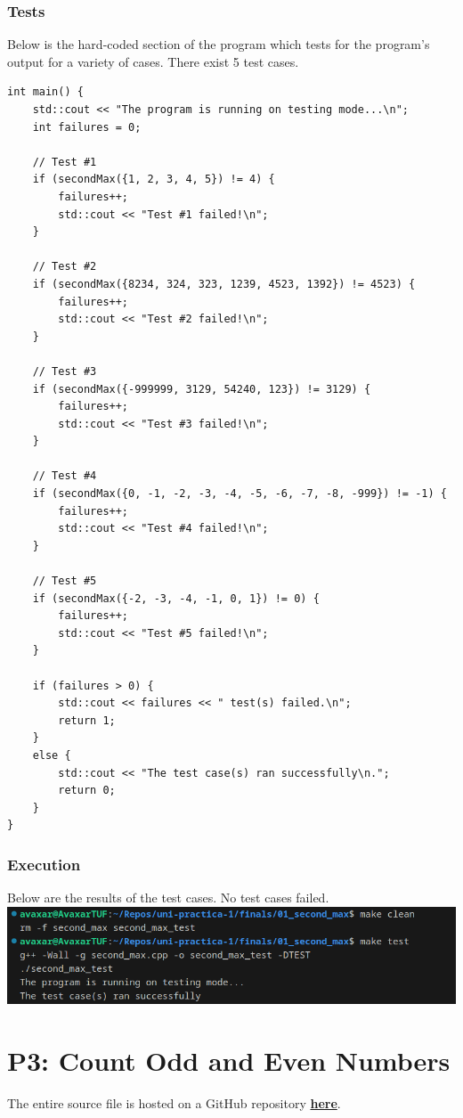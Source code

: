 \documentclass[12pt]{article}
\begin{document}
\subsubsection{Tests}

Below is the hard-coded section of the program which tests for the program's output for a variety of cases. There exist 5 test cases.

\begin{verbatim}
int main() {
    std::cout << "The program is running on testing mode...\n";
    int failures = 0;

    // Test #1
    if (secondMax({1, 2, 3, 4, 5}) != 4) {
        failures++;
        std::cout << "Test #1 failed!\n";
    }

    // Test #2
    if (secondMax({8234, 324, 323, 1239, 4523, 1392}) != 4523) {
        failures++;
        std::cout << "Test #2 failed!\n";
    }

    // Test #3
    if (secondMax({-999999, 3129, 54240, 123}) != 3129) {
        failures++;
        std::cout << "Test #3 failed!\n";
    }

    // Test #4
    if (secondMax({0, -1, -2, -3, -4, -5, -6, -7, -8, -999}) != -1) {
        failures++;
        std::cout << "Test #4 failed!\n";
    }

    // Test #5
    if (secondMax({-2, -3, -4, -1, 0, 1}) != 0) {
        failures++;
        std::cout << "Test #5 failed!\n";
    }

    if (failures > 0) {
        std::cout << failures << " test(s) failed.\n";
        return 1;
    }
    else {
        std::cout << "The test case(s) ran successfully\n.";
        return 0;
    }
}
\end{verbatim}

\subsubsection{Execution}
Below are the results of the test cases. No test cases failed.
\newline\includegraphics[width=\textwidth]{01_second_max_test}

\section{P3: Count Odd and Even Numbers}
The entire source file is hosted on a GitHub repository \href{https://github.com/avaxar/uni-practica-1/tree/main/finals/02_count_odd_even}{\textbf{here}}.
\end{document}

